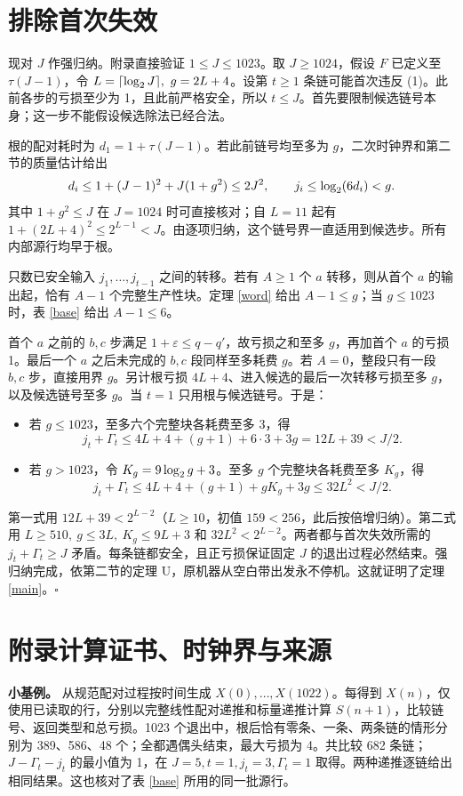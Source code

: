 \documentclass[UTF8,12pt,a4paper,fontset=fandol,scheme=plain]{ctexart}
\theoremstyle{cn}\newtheorem{thm}{定理}\newtheorem{lem}[thm]{引理}
\begin{document}
\newpage
\section{排除首次失效}
现对 \(J\) 作强归纳。附录直接验证 \(1\le J\le1023\)。取 \(J\ge1024\)，假设 \(F\) 已定义至 \(\tau(J-1)\)，令 \(L=\lceil\log_2 J\rceil,\ g=2L+4\)。设第 \(t\ge1\) 条链可能首次违反 (1)。此前各步的亏损至少为 1，且此前严格安全，所以 \(t\le J\)。首先要限制候选链号本身；这一步不能假设候选除法已经合法。

根的配对耗时为 \(d_1=1+\tau(J-1)\)。若此前链号均至多为 \(g\)，二次时钟界和第二节的质量估计给出
\[
 d_i\le1+(J-1)^2+J(1+g^2)\le2J^2,\qquad
 j_i\le\log_2(6d_i)<g .
\]
其中 \(1+g^2\le J\) 在 \(J=1024\) 时可直接核对；自 \(L=11\) 起有 \(1+(2L+4)^2\le2^{L-1}<J\)。由逐项归纳，这个链号界一直适用到候选步。所有内部源行均早于根。

只数已安全输入 \(j_1,\ldots,j_{t-1}\) 之间的转移。若有 \(A\ge1\) 个 \(a\) 转移，则从首个 \(a\) 的输出起，恰有 \(A-1\) 个完整生产性块。定理 \ref{word} 给出 \(A-1\le g\)；当 \(g\le1023\) 时，表 \ref{base} 给出 \(A-1\le6\)。

首个 \(a\) 之前的 \(b,c\) 步满足 \(1+\varepsilon\le q-q'\)，故亏损之和至多 \(g\)，再加首个 \(a\) 的亏损 1。最后一个 \(a\) 之后未完成的 \(b,c\) 段同样至多耗费 \(g\)。若 \(A=0\)，整段只有一段 \(b,c\) 步，直接用界 \(g\)。另计根亏损 \(4L+4\)、进入候选的最后一次转移亏损至多 \(g\)，以及候选链号至多 \(g\)。当 \(t=1\) 只用根与候选链号。于是：
\begin{itemize}
\item 若 \(g\le1023\)，至多六个完整块各耗费至多 3，得
\[
             j_t+\Gamma_t\le4L+4+(g+1)+6\cdot3+3g=12L+39<J/2 .
\]
\item 若 \(g>1023\)，令 \(K_g=9\log_2 g+3\)。至多 \(g\) 个完整块各耗费至多 \(K_g\)，得
\[
             j_t+\Gamma_t\le4L+4+(g+1)+gK_g+3g\le32L^2<J/2 .
\]
\end{itemize}
第一式用 \(12L+39<2^{L-2}\)（\(L\ge10\)，初值 \(159<256\)，此后按倍增归纳）。第二式用 \(L\ge510,\ g\le3L,\ K_g\le9L+3\) 和 \(32L^2<2^{L-2}\)。两者都与首次失效所需的 \(j_t+\Gamma_t\ge J\) 矛盾。每条链都安全，且正亏损保证固定 \(J\) 的退出过程必然结束。强归纳完成，依第二节的定理 U，原机器从空白带出发永不停机。这就证明了定理 \ref{main}。\hfill\(\square\)

\newpage
\section*{附录\quad 计算证书、时钟界与来源}
\textbf{小基例。} 从规范配对过程按时间生成 \(X(0),\ldots,X(1022)\)。每得到 \(X(n)\)，仅使用已读取的行，分别以完整线性配对递推和标量递推计算 \(S(n+1)\)，比较链号、返回类型和总亏损。1023 个退出中，根后恰有零条、一条、两条链的情形分别为 389、586、48 个；全都遇偶头结束，最大亏损为 4。共比较 682 条链；\(J-\Gamma_t-j_t\) 的最小值为 1，在 \(J=5,t=1,j_t=3,\Gamma_t=1\) 取得。两种递推逐链给出相同结果。这也核对了表 \ref{base} 所用的同一批源行。
\end{document}
